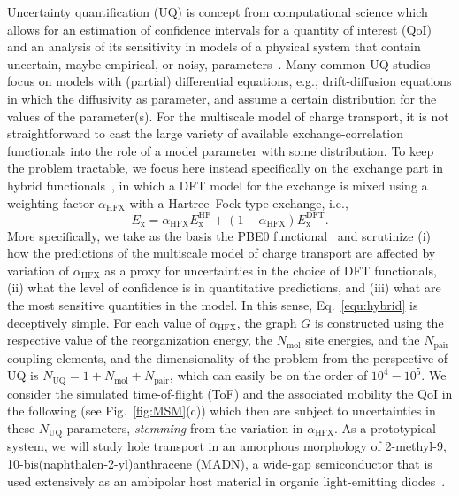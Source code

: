 \documentclass[%
 reprint,
superscriptaddress,
 amsmath,amssymb,
 aps,
prb,
floatfix
]{revtex4-2}
\newcommand{\bjoern}[2]{{\color{blue}{{\bf #1} #2}}}
\begin{document}
Uncertainty quantification (UQ) is concept from computational science which allows for an estimation of confidence intervals for a quantity of interest (QoI) and an analysis of its sensitivity in models of a physical system that contain uncertain, maybe empirical, or noisy, parameters~\cite{sarkar_uncertainty_2017,oconnor_quantifying_2024, chernatynskiy_uncertainty_2013, suleimenova_tutorial_2021,coveney_reliability_2021, coveney_when_2021}. Many common UQ studies focus on models with (partial) differential equations, e.g., drift-diffusion equations in which the diffusivity as parameter, and assume a certain distribution for the values of the parameter(s). For the multiscale model of charge transport, it is not straightforward to cast the large variety of available exchange-correlation functionals into the role of a model parameter with some distribution. To keep the problem tractable, we focus here instead specifically on the exchange part in hybrid functionals~\cite{perdew_rationale_1996,marques_densitybased_2011}, in which a DFT model for the exchange is mixed using a weighting factor $\alpha_\text{HFX}$ with a Hartree--Fock type exchange, i.e.,
%
\begin{equation}
  E_\text{x} = \alpha_\text{HFX} E_\text{x}^\text{HF} + (1-\alpha_\text{HFX})E_\text{x}^\text{DFT}.
  \label{equ:hybrid}
\end{equation}
%
More specifically, we take as the basis the PBE0 functional~\cite{adamo_toward_1999} and scrutinize (i) how the predictions of the multiscale model of charge transport are affected by variation of $\alpha_\text{HFX}$ as a proxy for uncertainties in the choice of DFT functionals, (ii) what the level of confidence is in quantitative predictions, and (iii) what are the most sensitive quantities in the model. In this sense, Eq.~\ref{equ:hybrid} is deceptively simple. For each value of $\alpha_\text{HFX}$, the graph $G$ is constructed using the respective value of the reorganization energy, the $N_\text{mol}$ site energies, and the $N_\text{pair}$ coupling elements, and the dimensionality of the problem from the perspective of UQ is $N_\text{UQ}=1+N_\text{mol}+N_\text{pair}$, which can easily be on the order of $10^{4}-10^{5}$. We consider the simulated time-of-flight (ToF) and the associated mobility the QoI in the following (see Fig.~\ref{fig:MSM}(c)) which then are subject to uncertainties in these $N_\text{UQ}$ parameters, {\em stemming} from the variation in $\alpha_\text{HFX}$. As a prototypical system, we will study hole transport in an amorphous morphology of 2-methyl-9, 10-bis(naphthalen-2-yl)anthracene (MADN), a wide-gap semiconductor that is used extensively as an ambipolar host material in organic light-emitting diodes~\bjoern{add}{citation}. 
\end{document}
